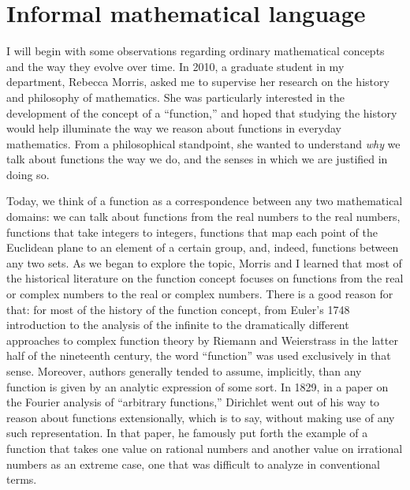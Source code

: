 \documentclass[11pt]{article}
\begin{document}
\section{Informal mathematical language}
\label{section:informal}

I will begin with some observations regarding ordinary mathematical concepts and the way they evolve over time. In 2010, a graduate student in my department, Rebecca Morris, asked me to supervise her research on the history and philosophy of mathematics. She was particularly interested in the development of the concept of a ``function,'' and hoped that studying the history would help illuminate the way we reason about functions in everyday mathematics. From a philosophical standpoint, she wanted to understand \emph{why} we talk about functions the way we do, and the senses in which we are justified in doing so.

Today, we think of a function as a correspondence between any two mathematical domains: we can talk about functions from the real numbers to the real numbers, functions that take integers to integers, functions that map each point of the Euclidean plane to an element of a certain group, and, indeed, functions between any two sets. As we began to explore the topic, Morris and I learned that most of the historical literature on the function concept focuses on functions from the real or complex numbers to the real or complex numbers. There is a good reason for that: for most of the history of the function concept, from Euler's 1748 introduction to the analysis of the infinite to the dramatically different approaches to complex function theory by Riemann and Weierstrass in the latter half of the nineteenth century, the word ``function'' was used exclusively in that sense. Moreover, authors generally tended to assume, implicitly, than any function is given by an analytic expression of some sort. In 1829, in a paper on the Fourier analysis of ``arbitrary functions,'' Dirichlet went out of his way to reason about functions extensionally, which is to say, without making use of any such representation. In that paper, he famously put forth the example of a function that takes one value on rational numbers and another value on irrational numbers as an extreme case, one that was difficult to analyze in conventional terms.
\end{document}
